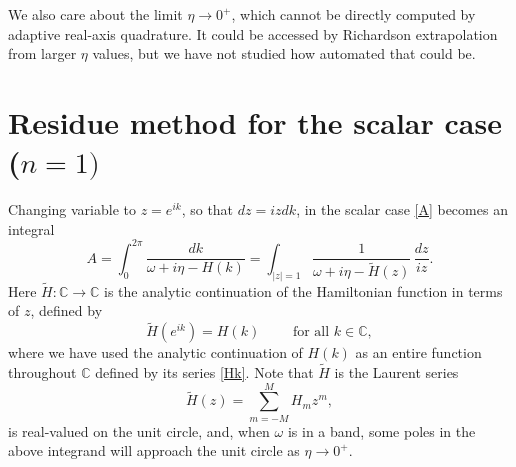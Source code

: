 \documentclass[11pt]{article}
\newcommand{\be}{\begin{equation}}
\newcommand{\ee}{\end{equation}}
\newcommand{\C}{\mathbb{C}}
\newcommand{\om}{\omega}
\newcommand{\tH}{\tilde H}
\begin{document}
We also care about the limit $\eta\to0^+$, which cannot be directly
computed by adaptive real-axis quadrature. It could be accessed by
Richardson extrapolation from larger $\eta$ values, but we have not
studied how automated that could be.


\section{Residue method for the scalar case ($n=1)$}
\label{scalar}

Changing variable to $z=e^{ik}$,
so that $dz = i z dk$,
in the scalar case \eqref{A} becomes an integral
\be
A = \int_{0}^{2\pi} \frac{dk}{\om +i\eta - H(k)}
 = \int_{|z|=1} \frac{1}{\om +i\eta - \tH(z)} \, \frac{dz}{iz}.
\label{As}
\ee
Here $\tH:\C\to\C$ is the analytic continuation of the
Hamiltonian function in terms of $z$,
defined by
\be
\tH(e^{ik}) = H(k) \qquad \mbox{ for all } k\in\C,
\label{tH}
\ee
where we have used the analytic continuation of $H(k)$
as an entire function throughout $\C$ defined by its series \eqref{Hk}.
Note that $\tH$ is the Laurent series
\be
\tH(z) = \sum_{m=-M}^M H_m z^m,
\label{Laur}
\ee
is real-valued on the unit circle, and, when $\om$ is in a band,
some poles in the above integrand will approach the unit circle
as $\eta\to0^+$.
\end{document}
